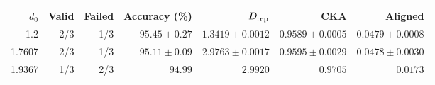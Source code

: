 \begin{tabular}{rrrrrrr}
\toprule
$d_0$ & Valid & Failed & Accuracy (\%) & $D_{\rm rep}$ & CKA & Aligned \\
\midrule
1.2 & 2/3 & 1/3 & $95.45\pm0.27$ & $1.3419\pm0.0012$ & $0.9589\pm0.0005$ & $0.0479\pm0.0008$ \\
1.7607 & 2/3 & 1/3 & $95.11\pm0.09$ & $2.9763\pm0.0017$ & $0.9595\pm0.0029$ & $0.0478\pm0.0030$ \\
1.9367 & 1/3 & 2/3 & $94.99$ & $2.9920$ & $0.9705$ & $0.0173$ \\
\bottomrule
\end{tabular}
